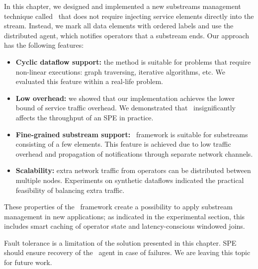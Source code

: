 In this chapter, we designed and implemented a new substreams management technique called \tracker\ that does not require injecting service elements directly into the stream. Instead, we mark all data elements with ordered labels and use the distributed agent, which notifies operators that a substream ends. Our approach has the following features:

\begin{itemize}
     \item {\bf Cyclic dataflow support:} the method is suitable for problems that require non-linear executions: graph traversing, iterative algorithms, etc. We evaluated this feature within a real-life problem.
     \item {\bf Low overhead:} we showed that our implementation achieves the lower bound of service traffic overhead. We demonstrated that \tracker\ insignificantly affects the throughput of an SPE in practice.
     \item {\bf Fine-grained substream support:} \tracker\ framework is suitable for substreams consisting of a few elements. This feature is achieved due to low traffic overhead and propagation of notifications through separate network channels.
     \item {\bf Scalability:} extra network traffic from operators can be distributed between multiple nodes. Experiments on synthetic dataflows indicated the practical feasibility of balancing extra traffic.
\end{itemize}

These properties of the \tracker\ framework create a possibility to apply substream management in new applications; as indicated in the experimental section, this includes smart caching of operator state and latency-conscious windowed joins.

Fault tolerance is a limitation of the solution presented in this chapter. SPE should ensure recovery of the \tracker\ agent in case of failures. We are leaving this topic for future work.
